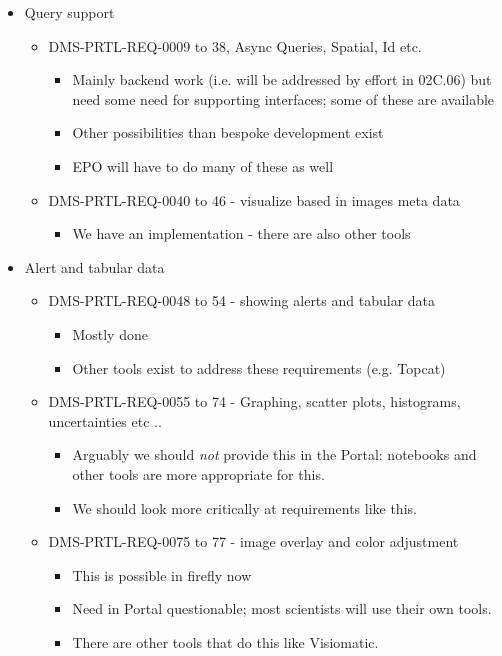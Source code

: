 \begin{itemize}
\item Query support
\begin{itemize}
\item DMS-PRTL-REQ-0009 to 38, Async Queries, Spatial, Id etc.
\begin{itemize}
\item Mainly backend work (i.e. will be addressed by effort in 02C.06) but need some need for supporting interfaces; some of these are available
\item Other possibilities than bespoke development exist
\item EPO will have to do many of these as well
\end{itemize}
\item DMS-PRTL-REQ-0040 to 46 - visualize based in images meta data
\begin{itemize}
\item  We have an implementation - there are also other tools
\end{itemize}
\end{itemize}


\item Alert and tabular data
\begin{itemize}
\item DMS-PRTL-REQ-0048 to 54 - showing alerts and tabular data
\begin{itemize}
\item Mostly done
\item Other tools exist to address these requirements (e.g. Topcat)
\end{itemize}
\item DMS-PRTL-REQ-0055 to 74 - Graphing, scatter plots, histograms, uncertainties etc ..
\begin{itemize}
\item Arguably we should \emph{not} provide this in the Portal: notebooks and other tools are more appropriate for this.
\item We should look more critically at requirements like this.
\end{itemize}

\item DMS-PRTL-REQ-0075 to 77 - image overlay and color adjustment
\begin{itemize}
\item This is possible in firefly now
\item Need in Portal questionable; most scientists will use their own tools.
\item There are other tools that do this like Visiomatic.
\end{itemize}


\end{itemize}
\end{itemize}
